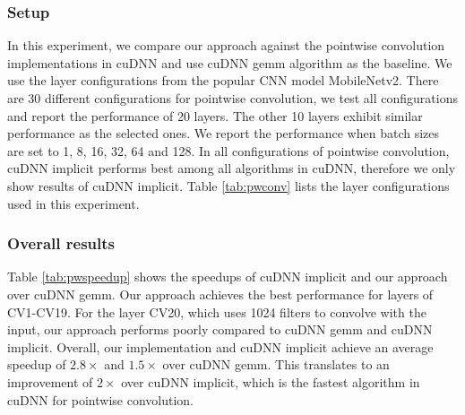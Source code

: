 \subsubsection{Setup} In this experiment, we compare our approach against the pointwise convolution implementations in cuDNN and use cuDNN gemm algorithm as the baseline. 
We use the layer configurations from the popular CNN model MobileNetv2.
There are 30 different configurations for pointwise convolution, we test all configurations and report the performance of 20 layers. 
The other 10 layers exhibit similar performance as the selected ones.  
We report the performance when batch sizes are set to 1, 8, 16, 32, 64 and 128.
In all configurations of pointwise convolution, cuDNN implicit performs best among all algorithms in cuDNN, therefore we only show results of cuDNN implicit.
Table \ref{tab:pwconv} lists the layer configurations used in this experiment.

\subsubsection{Overall results} Table \ref{tab:pwspeedup} shows the speedups of cuDNN implicit and our approach over cuDNN gemm.
Our approach achieves the best performance for layers of CV1-CV19.
For the layer CV20, which uses 1024 filters to convolve with the input, our approach performs poorly compared to cuDNN gemm and cuDNN implicit.
Overall, our implementation and cuDNN implicit achieve an average speedup of $2.8\times$ and $1.5\times$ over cuDNN gemm. 
This translates to an improvement of $2\times$ over cuDNN implicit, which is the fastest algorithm in cuDNN for pointwise convolution.

